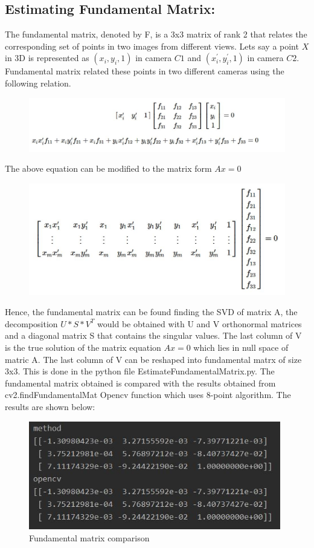\documentclass[12pt]{article}
\begin{document}
\subsection{Estimating Fundamental Matrix:}The fundamental matrix, denoted by F, is a 3x3 matrix of rank 2 that relates the corresponding set of points in two images from different views. Lets say a point $X$ in 3D is represented as $(x_i, y_i, 1)$ in camera $C1$ and $(x^{'}_i, y^{'}_i, 1)$ in camera $C2$. Fundamental matrix related these points in two different cameras using the following relation.
\newpage
\begin{figure}[h]
    \centering
    \includegraphics[width=13cm]{FM}
\end{figure}
The above equation can be modified to the matrix form $Ax = 0$
\begin{figure}[h]
    \centering
    \includegraphics[width=13cm]{FM2}
\end{figure}
Hence, the fundamental matrix can be found finding the SVD of matrix A, the decomposition $U*S*V^T$ would be obtained with U and V orthonormal matrices and a diagonal matrix S that contains the singular values. The last column of V is the true solution of the matrix equation $Ax = 0$ which lies in null space of matric A. The last column of V can be reshaped into fundamental matrx of size 3x3. This is done in the python file EstimateFundamentalMatrix.py. The fundamental matrix obtained is compared with the results obtained from cv2.findFundamentalMat Opencv function which uses 8-point algorithm. The results are shown below:
\begin{figure}[h]
    \centering
    \includegraphics[width=11cm]{funmat}
    \caption{Fundamental matrix comparison}
    \label{fig:Fundamental matrix comparison}
\end{figure}
\end{document}
